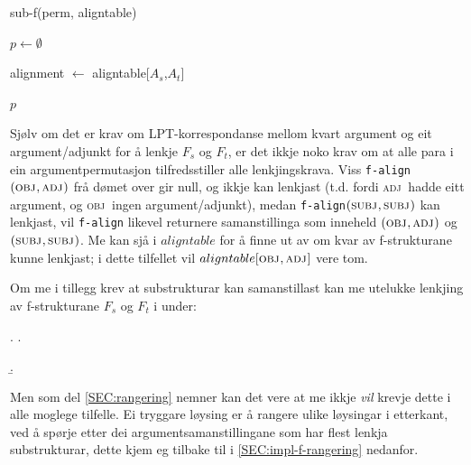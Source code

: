 \documentclass[12pt,a4paper,oneside,draft]{report}
\newcommand{\F}[2]{\textsc{#1}\ensuremath{_{#2}}}
\newcommand{\OBJ}{\F{obj}{}}
\newcommand{\OBJs}{\F{obj~}{}}
\newcommand{\ADJ}{\F{adj}{}}
\newcommand{\ADJs}{\F{adj~}{}}
\newcommand{\SUBJ}{\F{subj}{}}
\begin{document}
  \begin{algorithm}[]
    \caption{sub-f(perm, aligntable)}
    \label{algo:sub-f}
    
    $p \gets \emptyset$  \;
         {
           {
            alignment $\gets$ aligntable[$A_s$,$A_t$] \;
          }
          
        }
    \Return $p$
  \end{algorithm}    

Sjølv om det er krav om LPT-korrespondanse mellom kvart argument og
eit argument/adjunkt for å lenkje $F_s$ og $F_t$, er det ikkje noko
krav om at alle para i ein argumentpermutasjon tilfredsstiller alle
lenkjingskrava. Viss \texttt{f-align}$(\OBJ,\ADJ)$ frå dømet over gir
null, og ikkje kan lenkjast (t.d. fordi \ADJs hadde eitt argument, og
\OBJs ingen argument/adjunkt), medan \texttt{f-align}$(\SUBJ,\SUBJ)$
kan lenkjast, vil \texttt{f-align} likevel returnere samanstillinga som
inneheld $(\OBJ,\ADJ)$ og $(\SUBJ,\SUBJ)$. Me kan sjå i $aligntable$
for å finne ut av om kvar av f-strukturane kunne lenkjast; i dette
tilfellet vil $aligntable[\OBJ,\ADJ]$ vere tom.



Om me i tillegg krev at substrukturar kan samanstillast kan me
utelukke lenkjing av f-strukturane $F_s$ og $F_t$ i \Next under:

{\avmoptions{}

\ex. \a.  \begin{avm}    \end{avm}
  \b.\begin{avm}  \end{avm}

}

Men som del \ref{SEC:rangering} nemner kan det vere at me ikkje \emph{vil}
krevje dette i alle moglege tilfelle. Ei tryggare løysing er å rangere
ulike løysingar i etterkant, ved å spørje etter dei
argumentsamanstillingane som har flest lenkja substrukturar, dette
kjem eg tilbake til i \ref{SEC:impl-f-rangering} nedanfor.
\end{document}
